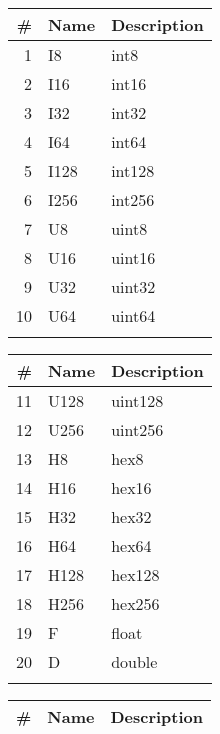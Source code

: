 \documentclass[documentation]{subfiles}
\begin{document}
\begin{savenotes}
\begin{minipage}{0.28\textwidth}
    \begin{longtable}{rll}
        \toprule
        {\bf \#} & {\bf Name} & {\bf Description}\\
        \midrule\endhead%
         1 & I8   & int8\\
         2 & I16  & int16\\
         3 & I32  & int32\\
         4 & I64  & int64\\
         5 & I128 & int128\\
         6 & I256 & int256\\
         7 & U8   & uint8\\
         8 & U16  & uint16\\
         9 & U32  & uint32\\
        10 & U64  & uint64\\\\
        \bottomrule
    \end{longtable}
\end{minipage}
\begin{minipage}{0.28\textwidth}
    \begin{longtable}{rll}
        \toprule
        {\bf \#} & {\bf Name} & {\bf Description}\\
        \midrule\endhead%
        11 & U128 & uint128\\
        12 & U256 & uint256\\
        13 & H8   & hex8\\
        14 & H16  & hex16\\
        15 & H32  & hex32\\
        16 & H64  & hex64\\
        17 & H128 & hex128\\
        18 & H256 & hex256\\
        19 & F    & float\\
        20 & D    & double\\\\
        \bottomrule
    \end{longtable}
\end{minipage}
\begin{minipage}{0.4\textwidth}
    \begin{longtable}{rll}
        \toprule
        {\bf \#} & {\bf Name} & {\bf Description}\\
        \midrule\endhead%

\end{longtable}
\end{minipage}
\end{savenotes}
\end{document}
